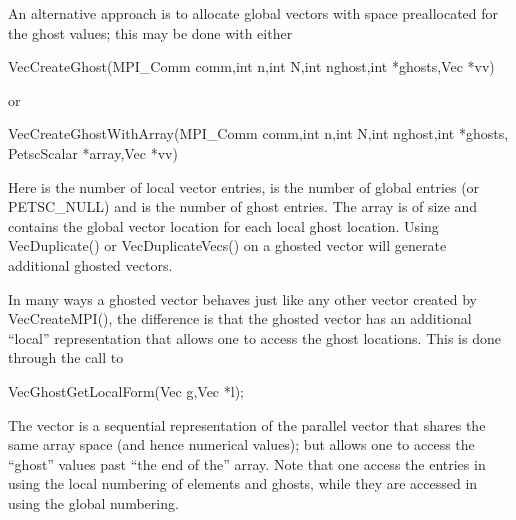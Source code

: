 An alternative approach is to allocate global vectors with space preallocated for
the ghost values; this may be done with either
\begin{tabbing}
  VecCreateGhost(MPI\_Comm comm,int n,int N,int nghost,int *ghosts,Vec *vv)
\end{tabbing}
or
\begin{tabbing}
  VecCreateGhostWithArray(MPI\_Comm comm,int n,int N,int nghost,int *ghosts,\\
                                  PetscScalar *array,Vec *vv)
\end{tabbing}
Here   is the
number of local vector entries,  is the number of 
global entries (or PETSC\_NULL) and  is the number of
ghost entries. The array  is of size  and contains the
global vector location for each local ghost location. Using VecDuplicate()
or VecDuplicateVecs() on a ghosted vector will generate additional ghosted vectors.

In many ways a ghosted vector behaves just like any other  vector created
by VecCreateMPI(), the difference is that the ghosted vector has an additional
``local'' representation that allows one to access the ghost locations. This is done
through the call to
\begin{tabbing}
 VecGhostGetLocalForm(Vec g,Vec *l);
\end{tabbing}
The vector  is a
sequential representation of the parallel vector 
that shares the same array space (and hence numerical values); but allows one to
access the ``ghost'' values past ``the end of the'' array. Note that one access the
entries in  using the local numbering of elements and ghosts, while they
are accessed in  using the global numbering.

